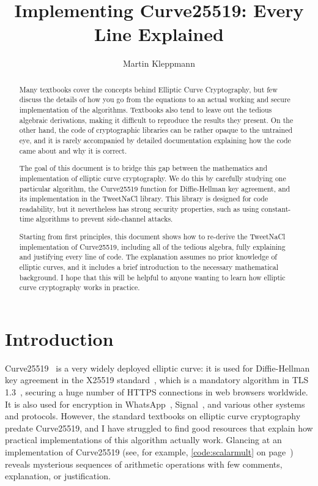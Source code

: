 \documentclass{article}
\begin{document}
\def\listingautorefname{Listing}%
\def\sectionautorefname{Section}%
\def\subsectionautorefname{Section}%
\def\subsubsectionautorefname{Section}%

\title{Implementing Curve25519: Every Line Explained}
\author{Martin Kleppmann}
\date{}
\maketitle
\begin{abstract}
Many textbooks cover the concepts behind Elliptic Curve Cryptography, but few discuss the details of how you go from the equations to an actual working and secure implementation of the algorithms.
Textbooks also tend to leave out the tedious algebraic derivations, making it difficult to reproduce the results they present.
On the other hand, the code of cryptographic libraries can be rather opaque to the untrained eye, and it is rarely accompanied by detailed documentation explaining how the code came about and why it is correct.

The goal of this document is to bridge this gap between the mathematics and implementation of elliptic curve cryptography.
We do this by carefully studying one particular algorithm, the Curve25519 function for Diffie-Hellman key agreement, and its implementation in the TweetNaCl library.
This library is designed for code readability, but it nevertheless has strong security properties, such as using constant-time algorithms to prevent side-channel attacks.

Starting from first principles, this document shows how to re-derive the TweetNaCl implementation of Curve25519, including all of the tedious algebra, fully explaining and justifying every line of code.
The explanation assumes no prior knowledge of elliptic curves, and it includes a brief introduction to the necessary mathematical background.
I hope that this will be helpful to anyone wanting to learn how elliptic curve cryptography works in practice.
\end{abstract}

\section{Introduction}

Curve25519~\cite{Bernstein:2006kw} is a very widely deployed elliptic curve: it is used for Diffie-Hellman key agreement in the X25519 standard~\cite{X25519}, which is a mandatory algorithm in TLS 1.3~\cite{TLS13}, securing a huge number of HTTPS connections in web browsers worldwide.
It is also used for encryption in WhatsApp~\cite{WhatsAppWhitepaper}, Signal~\cite{Marlinspike:2016}, and various other systems and protocols.
However, the standard textbooks on elliptic curve cryptography \cite{Blake:1999,Cohen:2006,Hankerson:2004,Koblitz:1994} predate Curve25519, and I have struggled to find good resources that explain how practical implementations of this algorithm actually work.
Glancing at an implementation of Curve25519 (see, for example, \autoref{code:scalarmult} on page~\pageref{code:scalarmult}) reveals mysterious sequences of arithmetic operations with few comments, explanation, or justification.
\end{document}
